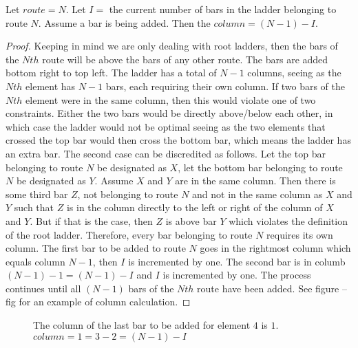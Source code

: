 

\begin{lemma}
  Let $route=N$. Let $I=$ the current number of bars in the ladder belonging to route $N$. 
  Assume a bar is being added. Then the $column=(N-1)-I$.
\end{lemma}
\begin{proof}
  Keeping in mind we are only dealing with root ladders, then the bars of the $Nth$ route will be above the bars of 
  any other route. The bars are added bottom right to top left. The ladder has a total of $N-1$ columns, seeing as 
  the $Nth$ element has $N-1$ bars, each requiring their own column. If two bars of the $Nth$ element were 
  in the same column, then this would violate one of two constraints. Either the two bars would be directly 
  above/below each other, in which case the ladder would not be optimal seeing as the two elements that crossed the 
  top bar would then cross the bottom bar, which means the ladder has an extra bar. The second case can be discredited as 
  follows. Let the top bar belonging to route $N$ be designated as $X$, let the bottom bar belonging to route $N$ be 
  designated as $Y$. Assume $X$ and $Y$ are in the same column.
  Then there is some third bar $Z$, not belonging to route $N$ and not in the same column 
  as $X$ and $Y$ such that $Z$ is in the column directly to the left or right of the column of $X$ and $Y$. But if that 
  is the case, then $Z$ is above bar $Y$ which violates the definition of the root ladder. Therefore, every bar 
  belonging to route $N$ requires its own column. The first bar to be added to route $N$ goes in the rightmost column which 
  equals column $N-1$, then $I$ is incremented by one. The second bar is in columb $(N-1)-1=(N-1)-I$ and $I$ is incremented 
  by one. The process continues until all $(N-1)$ bars of the $Nth$ route have been added. See figure --fig for an example 
  of column calculation.
\end{proof}

\begin{figure}[!htp]
  \begin{center}
  \end{center}
  \caption{The column of the last bar to be added for element $4$ is $1$. $column=1=3-2=(N-1)-I$}
\end{figure}


